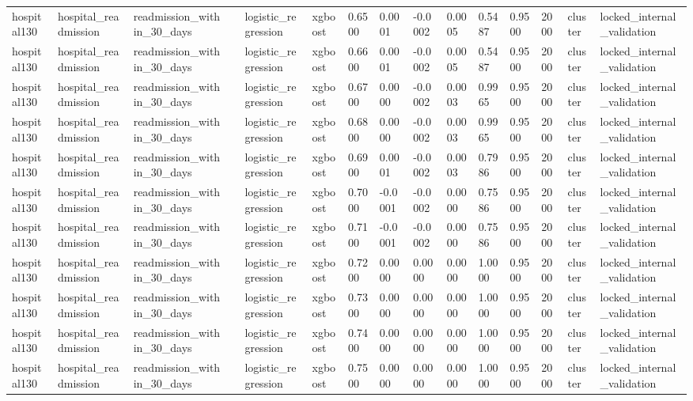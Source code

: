 \begin{tabular}{lllllllllllllll}
hospital130 & hospital\_readmission & readmission\_within\_30\_days &  & logistic\_regression & xgboost & 0.6500 & 0.0001 & -0.0002 & 0.0005 & 0.5487 & 0.9500 & 2000 & cluster & locked\_internal\_validation \\
hospital130 & hospital\_readmission & readmission\_within\_30\_days &  & logistic\_regression & xgboost & 0.6600 & 0.0001 & -0.0002 & 0.0005 & 0.5487 & 0.9500 & 2000 & cluster & locked\_internal\_validation \\
hospital130 & hospital\_readmission & readmission\_within\_30\_days &  & logistic\_regression & xgboost & 0.6700 & 0.0000 & -0.0002 & 0.0003 & 0.9965 & 0.9500 & 2000 & cluster & locked\_internal\_validation \\
hospital130 & hospital\_readmission & readmission\_within\_30\_days &  & logistic\_regression & xgboost & 0.6800 & 0.0000 & -0.0002 & 0.0003 & 0.9965 & 0.9500 & 2000 & cluster & locked\_internal\_validation \\
hospital130 & hospital\_readmission & readmission\_within\_30\_days &  & logistic\_regression & xgboost & 0.6900 & 0.0001 & -0.0002 & 0.0003 & 0.7986 & 0.9500 & 2000 & cluster & locked\_internal\_validation \\
hospital130 & hospital\_readmission & readmission\_within\_30\_days &  & logistic\_regression & xgboost & 0.7000 & -0.0001 & -0.0002 & 0.0000 & 0.7586 & 0.9500 & 2000 & cluster & locked\_internal\_validation \\
hospital130 & hospital\_readmission & readmission\_within\_30\_days &  & logistic\_regression & xgboost & 0.7100 & -0.0001 & -0.0002 & 0.0000 & 0.7586 & 0.9500 & 2000 & cluster & locked\_internal\_validation \\
hospital130 & hospital\_readmission & readmission\_within\_30\_days &  & logistic\_regression & xgboost & 0.7200 & 0.0000 & 0.0000 & 0.0000 & 1.0000 & 0.9500 & 2000 & cluster & locked\_internal\_validation \\
hospital130 & hospital\_readmission & readmission\_within\_30\_days &  & logistic\_regression & xgboost & 0.7300 & 0.0000 & 0.0000 & 0.0000 & 1.0000 & 0.9500 & 2000 & cluster & locked\_internal\_validation \\
hospital130 & hospital\_readmission & readmission\_within\_30\_days &  & logistic\_regression & xgboost & 0.7400 & 0.0000 & 0.0000 & 0.0000 & 1.0000 & 0.9500 & 2000 & cluster & locked\_internal\_validation \\
hospital130 & hospital\_readmission & readmission\_within\_30\_days &  & logistic\_regression & xgboost & 0.7500 & 0.0000 & 0.0000 & 0.0000 & 1.0000 & 0.9500 & 2000 & cluster & locked\_internal\_validation \\

\end{tabular}
